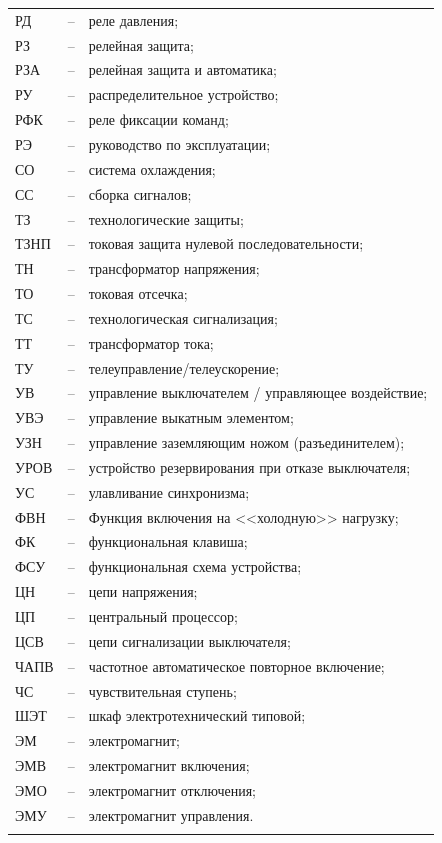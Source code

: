\begin{longtable}{>{\raggedright\arraybackslash}m{2cm}>{\raggedright\arraybackslash}m{0.5cm}>{\raggedright\arraybackslash}m{20cm}}
РД & -- & реле давления; \\
РЗ & -- & релейная защита; \\
РЗА & -- & релейная защита и автоматика; \\
РУ & -- & распределительное устройство; \\
РФК & -- & реле фиксации команд; \\
РЭ & -- & руководство по эксплуатации; \\
СО & -- & система охлаждения; \\
СС & -- & сборка сигналов; \\
ТЗ & -- & технологические защиты; \\
ТЗНП & -- & токовая защита нулевой последовательности; \\
ТН & -- & трансформатор напряжения; \\
ТО & -- & токовая отсечка; \\
ТС & -- & технологическая сигнализация; \\
ТТ & -- & трансформатор тока; \\
ТУ & -- & телеуправление/телеускорение; \\
УВ & -- & управление выключателем / управляющее воздействие; \\
УВЭ & -- & управление выкатным элементом; \\
УЗН & -- & управление заземляющим ножом (разъединителем); \\
УРОВ & -- & устройство резервирования при отказе выключателя; \\
УС & -- & улавливание синхронизма; \\
ФВН & -- & Функция включения на <<холодную>> нагрузку; \\
ФК & -- & функциональная клавиша; \\
ФСУ & -- & функциональная схема устройства; \\
ЦН & -- & цепи напряжения; \\
ЦП & -- & центральный процессор; \\
ЦСВ & -- & цепи сигнализации выключателя; \\
ЧАПВ & -- & частотное автоматическое повторное включение; \\
ЧС & -- & чувствительная ступень; \\
ШЭТ & -- & шкаф электротехнический типовой; \\
ЭМ & -- & электромагнит; \\
ЭМВ & -- & электромагнит включения; \\
ЭМО & -- & электромагнит отключения; \\
ЭМУ & -- & электромагнит управления. \\
{\color{white}\fontsize{0.1pt}{0.1pt}\selectfont<endABBRS>}
\end{longtable}
